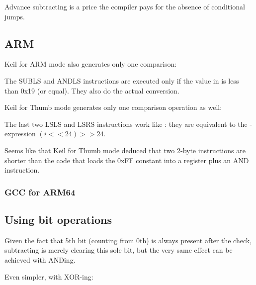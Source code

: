 Advance subtracting is a price the compiler pays for the absence of conditional jumps.

\subsection{ARM}

\Optimizing Keil for ARM mode also generates only one comparison:



The SUBLS and ANDLS instructions are executed only if the value in  is less than 0x19 (or equal).
They also do the actual conversion.

\Optimizing Keil for Thumb mode generates only one comparison operation as well:



The last two LSLS and LSRS instructions work like :
they are equivalent to the \CCpp-expression $(i<<24)>>24$.

Seems like that Keil for Thumb mode deduced that two 2-byte instructions are shorter than the code 
that loads the 0xFF constant into a register plus an AND instruction.

\subsubsection{GCC for ARM64}





\subsection{Using bit operations}
\label{toupper_bit}

Given the fact that 5th bit (counting from 0th) is always present after the check, subtracting is merely clearing
this sole bit, but the very same effect can be achieved with ANDing.

Even simpler, with XOR-ing:

